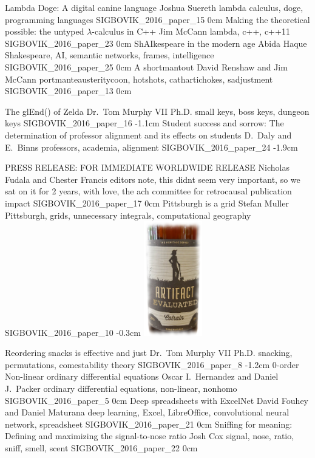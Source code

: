\addpaper
	{Lambda Doge: A digital canine language}
	{Joshua Suereth}
	{lambda calculus, doge, programming languages}
	{SIGBOVIK_2016_paper_15}
	{0cm}
	{}
\addpaper
	{Making the theoretical possible: the untyped $\lambda$-calculus in C++}
	{Jim McCann}
	{lambda, c++, c++11}
	{SIGBOVIK_2016_paper_23}
	{0cm}
	{}
\addpaper
	{ShAIkespeare in the modern age}
	{Abida Haque}
	{Shakespeare, AI, semantic networks, frames, intelligence}
	{SIGBOVIK_2016_paper_25}
	{0cm}
	{}
\addpaper
	{A shortmantout}
	{David Renshaw and Jim McCann}
	{portmanteausteritycoon, hotshots, cathartichokes, sadjustment}
	{SIGBOVIK_2016_paper_13}
	{0cm}
	{}

\addpaper
	{The glEnd() of Zelda}
	{Dr.\ Tom Murphy VII Ph.D.}
	{small keys, boss keys, dungeon keys}
	{SIGBOVIK_2016_paper_16}
	{-1.1cm}
	{}
\addpaper
	{Student success and sorrow: The determination of professor alignment and its effects on students}
	{D.\ Daly and E.\ Binns}
	{professors, academia, alignment}
	{SIGBOVIK_2016_paper_24}
	{-1.9cm}
	{}

\addpaper
	{PRESS RELEASE: FOR IMMEDIATE WORLDWIDE RELEASE}
	{Nicholas Fudala and Chester Francis}
	{editors note, this didnt seem very important, so we sat on it for 2 years, with love, the ach committee for retrocausal publication impact}
	{SIGBOVIK_2016_paper_17}
	{0cm}
	{}
\addpaper
	{Pittsburgh is a grid}
	{Stefan Muller}
	{Pittsburgh, grids, unnecessary integrals, computational geography}
	{SIGBOVIK_2016_paper_10}
	{-0.3cm}
	{\includegraphics[width=1in]{eval}}

\addpaper
	{Reordering snacks is effective and just}
	{Dr.\ Tom Murphy VII Ph.D.}
	{snacking, permutations, comestability theory}
	{SIGBOVIK_2016_paper_8}
	{-1.2cm}
	{}
\addpaper
	{0-order Non-linear ordinary differential equations}
	{Oscar I.\ Hernandez and Daniel J.\ Packer}
	{ordinary differential equations, non-linear, nonhomo}
	{SIGBOVIK_2016_paper_5}
	{0cm}
	{}
\addpaper
	{Deep spreadsheets with ExcelNet}
	{David Fouhey and Daniel Maturana}
	{deep learning, Excel, LibreOffice, convolutional neural network, spreadsheet}
	{SIGBOVIK_2016_paper_21}
	{0cm}
	{}
\addpaper
	{Sniffing for meaning: Defining and maximizing the signal-to-nose ratio}
	{Josh Cox}
	{signal, nose, ratio, sniff, smell, scent}
	{SIGBOVIK_2016_paper_22}
	{0cm}
	{}

